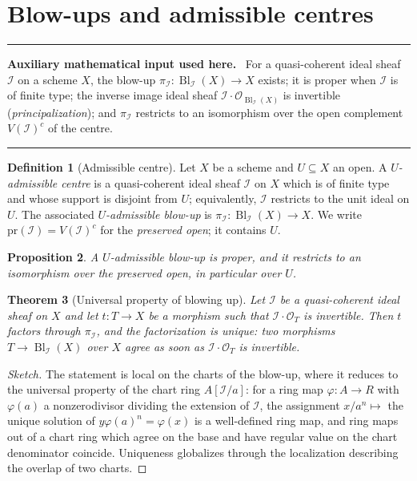 \documentclass[11pt,a4paper]{article}
\theoremstyle{plain}
\newtheorem{theorem}{Theorem}[section]
\newtheorem{proposition}[theorem]{Proposition}
\theoremstyle{definition}
\newtheorem{definition}[theorem]{Definition}
\theoremstyle{remark}
\newenvironment{auxinput}{%
  \par\medskip\begingroup\interlinepenalty=10000\relax
  \noindent\textcolor{orange!70!black}{\rule{\linewidth}{0.9pt}}%
  \par\nopagebreak\smallskip\noindent
  \textbf{Auxiliary mathematical input used here.}\ \ignorespaces}%
  {\par\nopagebreak\smallskip\nopagebreak\noindent
   \textcolor{orange!70!black}{\rule{\linewidth}{0.9pt}}\par\endgroup\medskip}
\newcommand{\Bl}{\operatorname{Bl}}
\newcommand{\sO}{\mathcal{O}}
\newcommand{\sI}{\mathcal{I}}
\begin{document}
\section{Blow-ups and admissible centres}
\label{sec:blowups}

\begin{auxinput}
For a quasi-coherent ideal sheaf $\sI$ on a scheme $X$, the blow-up
$\pi_\sI\colon\Bl_\sI(X)\to X$ exists; it is proper when $\sI$ is of finite
type; the inverse image ideal sheaf $\sI\cdot\sO_{\Bl_\sI(X)}$ is invertible
(\emph{principalization}); and $\pi_\sI$ restricts to an isomorphism over the
open complement $V(\sI)^{c}$ of the centre.
\end{auxinput}

\begin{definition}[Admissible centre]
\label{def:admissible}
Let $X$ be a scheme and $U\subseteq X$ an open. A \emph{$U$-admissible centre}
is a quasi-coherent ideal sheaf $\sI$ on $X$ which is of finite type and whose
support is disjoint from $U$; equivalently, $\sI$ restricts to the unit ideal
on $U$. The associated \emph{$U$-admissible blow-up} is
$\pi_\sI\colon\Bl_\sI(X)\to X$. We write $\mathrm{pr}(\sI)=V(\sI)^{c}$ for the
\emph{preserved open}; it contains $U$.
\end{definition}

\begin{proposition}
\label{prop:admissible-basic}
A $U$-admissible blow-up is proper, and it restricts to an isomorphism over the
preserved open, in particular over $U$.
\end{proposition}

\begin{theorem}[Universal property of blowing up]
\label{thm:0806}
Let $\sI$ be a quasi-coherent ideal sheaf on $X$ and let $t\colon T\to X$ be a
morphism such that $\sI\cdot\sO_T$ is invertible. Then $t$ factors through
$\pi_\sI$, and the factorization is unique: two morphisms $T\to\Bl_\sI(X)$ over
$X$ agree as soon as $\sI\cdot\sO_T$ is invertible.
\end{theorem}

\begin{proof}[Sketch]
The statement is local on the charts of the blow-up, where it reduces to the
universal property of the chart ring $A[\sI/a]$: for a ring map
$\varphi\colon A\to R$ with $\varphi(a)$ a nonzerodivisor dividing the extension
of $\sI$, the assignment $x/a^n\mapsto$ the unique solution of
$y\varphi(a)^n=\varphi(x)$ is a well-defined ring map, and ring maps out of a
chart ring which agree on the base and have regular value on the chart
denominator coincide. Uniqueness globalizes through the localization
describing the overlap of two charts.
\end{proof}
\end{document}
